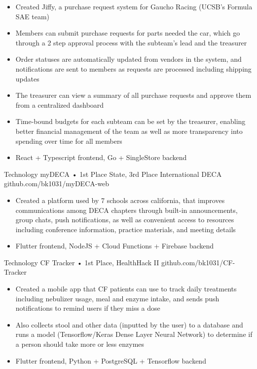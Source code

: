 \documentclass[9pt]{developercv} %
\begin{document}
\begin{entrylist}
{\begin{itemize}[noitemsep,topsep=0pt,parsep=0pt,partopsep=0pt, leftmargin=10pt]
            \item Created Jiffy, a purchase request system for Gaucho Racing (UCSB's Formula SAE team)
            \item Members can submit purchase requests for parts needed the car, which go through a 2 step approval process with the subteam's lead and the treasurer
            \item Order statuses are automatically updated from vendors in the system, and notifications are sent to members as requests are processed including shipping updates
            \item The treasurer can view a summary of all purchase requests and approve them from a centralized dashboard
            \item Time-bound budgets for each subteam can be set by the treasurer, enabling better financial management of the team as well as more transparency into spending over time for all members
            \item React + Typescript frontend, Go + SingleStore backend
        \end{itemize}}
    \entry
		{Technology}
		{myDECA • 1st Place State, 3rd Place International DECA}
		{github.com/bk1031/myDECA-web}
        {\vspace{-8pt}
        \begin{itemize}[noitemsep,topsep=0pt,parsep=0pt,partopsep=0pt, leftmargin=10pt]
            \item Created a platform used by 7 schools across california, that improves communications among DECA chapters through built-in announcements, group chats, push notifications, as well as convenient access to resources including conference information, practice materials, and meeting details
            \item Flutter frontend, NodeJS + Cloud Functions + Firebase backend
        \end{itemize}}
    \entry
		{Technology}
		{CF Tracker • 1st Place, HealthHack II}
		{github.com/bk1031/CF-Tracker}
        {\vspace{-8pt}
        \begin{itemize}[noitemsep,topsep=0pt,parsep=0pt,partopsep=0pt, leftmargin=10pt]
            \item Created a mobile app that CF patients can use to track daily treatments including nebulizer usage, meal and enzyme intake, and sends push notifications to remind users if they miss a dose
            \item Also collects stool and other data (inputted by the user) to a database and runs a model (Tensorflow/Keras Dense Layer Neural Network) to determine if a person should take more or less enzymes
            \item Flutter frontend, Python + PostgreSQL + Tensorflow backend
        \end{itemize}}
\end{entrylist}
\end{document}
